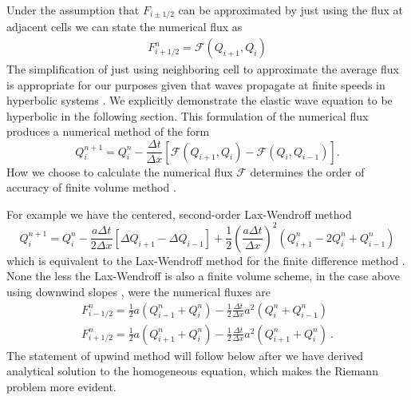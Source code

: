 \documentclass[review,onefignum,onetabnum]{siamart171218}
\begin{document}
Under the assumption that $F_{i \pm 1/2}$ can be approximated by just using the flux at adjacent cells we can state the numerical flux as
\begin{align}
    F_{i + 1/2}^n = \mathcal{F} \left( Q_{i+1}, Q_{i} \right)
\end{align}
The simplification of just using neighboring cell to approximate the average flux is appropriate for our purposes given that waves propagate at finite speeds in hyperbolic systems \cite{leveque_2002}. We explicitly demonstrate the elastic wave equation to be hyperbolic in the following section. 
This formulation of the numerical flux produces a numerical method of the form
\begin{equation}
     Q_i^{n+1}  = Q_i^{n} - \frac{\Delta t}{\Delta x} \left[ \mathcal{F}(Q_{i+1},Q_i) - \mathcal{F}(Q_i,Q_{i-1}) \right].
     \label{eq:finitvolumebase}
\end{equation}
How we choose to calculate the numerical flux $\mathcal{F}$ determines the order of accuracy of finite volume method \cite{leveque_2002}. 

For example we have the centered, second-order Lax-Wendroff method
\begin{equation}
      Q_i^{n+1} = Q_i^{n} - \frac{a \Delta t}{2 \Delta x} \left[\Delta Q_{i+1} - \Delta Q_{i-1} \right] + \frac{1}{2} \left( \frac{ a\Delta t}{\Delta x}\right)^2 \left(Q_{i+1}^n - 2Q_i^n + Q^n_{i-1}\right)
\end{equation}  
which is equivalent to the Lax-Wendroff method for the finite difference method \cite{comp_seis}. None the less the Lax-Wendroff is also a finite volume scheme, in the case above using downwind slopes \cite{comp_seis}, were the numerical fluxes are
\begin{equation}
\begin{gathered}
    F_{i-1/2}^n = \frac{1}{2} a (Q_{i-1}^n + Q_i^n) - \frac{1}{2} \frac{\Delta t}{\Delta x} a^2 (Q_i^n + Q^n_{i-1}) \\
    F_{i+1/2}^n = \frac{1}{2} a (Q_{i+1}^n + Q_i^n) - \frac{1}{2} \frac{\Delta t}{\Delta x} a^2 (Q_{i+1}^n + Q^n_{i}) \: .
\end{gathered}
\end{equation}
The statement of upwind method will follow below after we have derived analytical solution to the homogeneous equation, which makes the Riemann problem more evident. 
\end{document}
